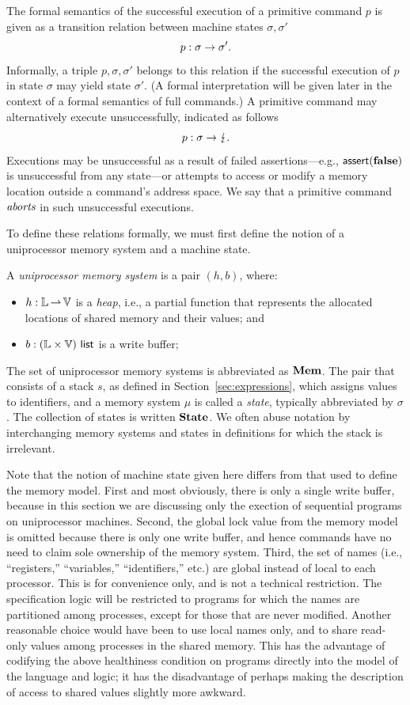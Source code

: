 \documentclass[11pt]{report}
\begin{document}
The formal semantics of the successful execution of a primitive command $p$ is given as a transition relation between machine states $\sigma,\sigma'$ \[ p : \sigma \rightarrow \sigma'. \] Informally, a triple $p,\sigma,\sigma'$ belongs to this relation if the successful execution of $p$ in state $\sigma$ may yield state $\sigma'$. (A formal interpretation will be given later in the context of a formal semantics of full commands.) A primitive command may alternatively execute unsuccessfully, indicated as follows \[ p : \sigma \rightarrow \lightning. \] Executions may be unsuccessful as a result of failed assertions---e.g., $\operatorname{\mathsf{assert}}(\mathbf{false})$ is unsuccessful from any state---or attempts to access or modify a memory location outside a command's address space. We say that a primitive command $\emph{aborts}$ in such unsuccessful executions. 

To define these relations formally, we must first define the notion of a uniprocessor memory system and a machine state. 

\begin{definition}
A \emph{uniprocessor memory system} is a pair $(h,b)$, where: \begin{itemize}
    \item $h : \mathbb{L} \operatorname{\rightharpoonup} \mathbb{V}$ is a \emph{heap}, i.e., a partial function that represents the allocated locations of shared memory and their values; and 
    \item $b : (\mathbb{L} \times \mathbb{V})~\mathsf{list}$ is a write buffer;
\end{itemize}
\end{definition} 
The set of uniprocessor memory systems is abbreviated as $\mathbf{Mem}$.
The pair that consists of a stack $s$, as defined in Section~\ref{sec:expressions}, which assigns values to identifiers, and a memory system $\mu$ is called a \emph{state}, typically abbreviated by $\sigma$. The collection of states is written $\mathbf{State}$. We often abuse notation by interchanging memory systems and states in definitions for which the stack is irrelevant. 

Note that the notion of machine state given here differs from that used to define the memory model. First and most obviously, there is only a single write buffer, because in this section we are discussing only the exection of sequential programs on uniprocessor machines. Second, the global lock value from the memory model is omitted because there is only one write buffer, and hence commands have no need to claim sole ownership of the memory system. Third, the set of names (i.e., ``registers,'' ``variables,'' ``identifiers,'' etc.) are global instead of local to each processor. This is for convenience only, and is not a technical restriction. The specification logic will be restricted to programs for which the names are partitioned among processes, except for those that are never modified. Another reasonable choice would have been to use local names only, and to share read-only values among processes in the shared memory. This has the advantage of codifying the above healthiness condition on programs directly into the model of the language and logic; it has the disadvantage of perhaps making the description of access to shared values slightly more awkward. 
\end{document}
